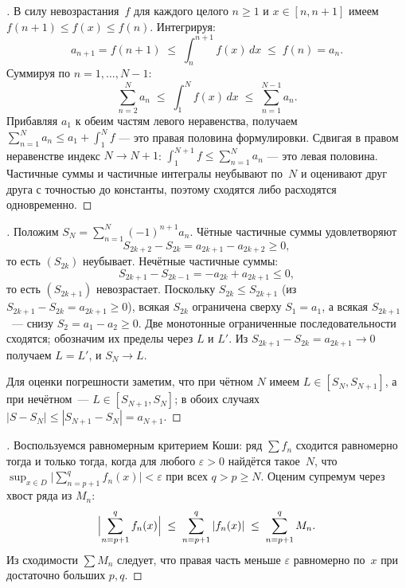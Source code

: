 \begin{proof}[]
В силу невозрастания~$f$ для каждого целого $n \ge 1$ и
$x \in [n, n+1]$ имеем $f(n+1) \le f(x) \le f(n)$. Интегрируя:
\[
  a_{n+1} = f(n+1) \;\le\; \int_n^{n+1} f(x)\, dx \;\le\; f(n) = a_n.
\]
Суммируя по $n = 1, \dots, N - 1$:
\[
  \sum_{n=2}^{N} a_n \;\le\; \int_1^{N} f(x)\, dx \;\le\; \sum_{n=1}^{N-1} a_n.
\]
Прибавляя $a_1$ к обеим частям левого неравенства, получаем
$\sum_{n=1}^{N} a_n \le a_1 + \int_1^N f$ — это правая половина
формулировки. Сдвигая в правом неравенстве индекс $N \to N + 1$:
$\int_1^{N+1} f \le \sum_{n=1}^{N} a_n$ — это левая половина.
Частичные суммы и частичные интегралы неубывают по~$N$ и оценивают
друг друга с точностью до константы, поэтому сходятся либо расходятся
одновременно.
\end{proof}

\begin{proof}[]
Положим $S_N = \sum_{n=1}^{N} (-1)^{n+1} a_n$. Чётные частичные
суммы удовлетворяют
\[
  S_{2k+2} - S_{2k} = a_{2k+1} - a_{2k+2} \ge 0,
\]
то есть $(S_{2k})$ неубывает. Нечётные частичные суммы:
\[
  S_{2k+1} - S_{2k-1} = -a_{2k} + a_{2k+1} \le 0,
\]
то есть $(S_{2k+1})$ невозрастает. Поскольку $S_{2k} \le S_{2k+1}$
(из $S_{2k+1} - S_{2k} = a_{2k+1} \ge 0$), всякая $S_{2k}$ ограничена
сверху $S_1 = a_1$, а всякая $S_{2k+1}$~--- снизу
$S_2 = a_1 - a_2 \ge 0$. Две монотонные ограниченные
последовательности сходятся; обозначим их пределы через $L$ и $L'$.
Из $S_{2k+1} - S_{2k} = a_{2k+1} \to 0$ получаем $L = L'$, и
$S_N \to L$.

Для оценки погрешности заметим, что при чётном $N$ имеем
$L \in [S_{N}, S_{N+1}]$, а при нечётном~--- $L \in [S_{N+1}, S_N]$;
в обоих случаях $|S - S_N| \le |S_{N+1} - S_N| = a_{N+1}$.
\end{proof}

\begin{proof}[]
Воспользуемся равномерным критерием Коши: ряд $\sum f_n$ сходится
равномерно тогда и только тогда, когда для любого $\varepsilon > 0$
найдётся такое~$N$, что
$\sup_{x \in D} \bigl|\sum_{n=p+1}^{q} f_n(x)\bigr| < \varepsilon$
при всех $q > p \ge N$. Оценим супремум через хвост ряда из $M_n$:
\[
  \Bigl| \sum_{n=p+1}^{q} f_n(x) \Bigr|
  \;\le\; \sum_{n=p+1}^{q} |f_n(x)|
  \;\le\; \sum_{n=p+1}^{q} M_n.
\]
Из сходимости $\sum M_n$ следует, что правая часть меньше
$\varepsilon$ равномерно по~$x$ при достаточно больших $p, q$.
\end{proof}

